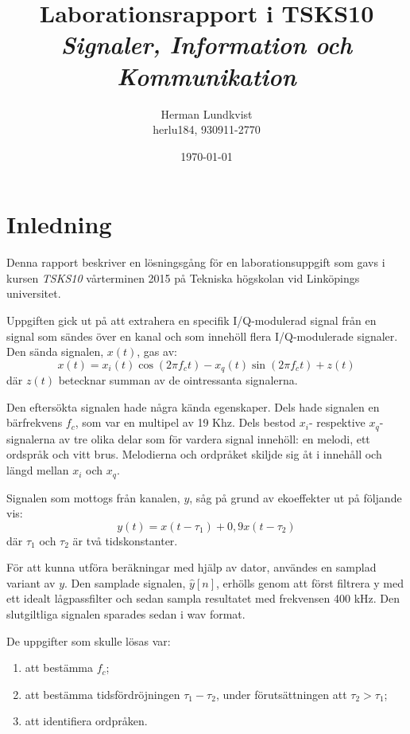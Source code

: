 \documentclass[10pt,twocolumn]{article}
\title{Laborationsrapport i TSKS10 \emph{Signaler, Information och Kommunikation}}
\author{Herman Lundkvist \\ herlu184, 930911-2770 }
\date{\today}
\begin{document}
\newcommand{\yhat}{$\hat{y}[n]$\xspace}

\maketitle

\section{Inledning}

Denna rapport beskriver en lösningsgång för en laborationsuppgift som gavs i
kursen \emph{TSKS10} vårterminen 2015 på Tekniska högskolan vid Linköpings
universitet.

Uppgiften gick ut på att extrahera en specifik I/Q-modulerad signal från en signal som sändes
över en kanal och som innehöll flera I/Q-modulerade signaler. Den sända signalen, $x(t)$, gas av:
\begin{equation}
x(t) = x_i(t) \cos(2 \pi f_ct) - x_q(t) \sin(2 \pi f_c t) + z(t)
\label{e1}
\end{equation}
där $z(t)$ betecknar summan av de ointressanta signalerna.

Den eftersökta signalen hade några kända egenskaper. Dels hade signalen en
bärfrekvens $f_c$, som var en multipel av 19 Khz. Dels bestod $x_i$- respektive
$x_q$-signalerna av tre olika delar som för vardera signal innehöll: en melodi, ett ordspråk
och vitt brus. Melodierna och ordpråket skiljde sig åt i
innehåll och längd mellan $x_i$ och $x_q$.

Signalen som mottogs från kanalen, $y$, såg på grund av ekoeffekter ut på
följande vis:
\begin{equation}
    y(t)=x(t - \tau_1) + 0,9 x(t - \tau_2)
\end{equation}
där $\tau_1$ och $\tau_2$ är två tidskonstanter.

För att kunna utföra beräkningar med hjälp av dator, användes en samplad
variant av $y$. Den samplade signalen, \yhat, erhölls genom att först
filtrera y med ett idealt lågpassfilter och sedan sampla resultatet med
frekvensen 400 kHz. Den slutgiltliga signalen sparades sedan i wav format.

De uppgifter som skulle lösas var:
\begin{enumerate}
\item att bestämma $f_c$;
\item att bestämma tidsfördröjningen $\tau_1-\tau_2$, under förutsättningen att
$\tau_2 > \tau_1$;
\item att identifiera ordpråken.
\end{enumerate}
\end{document}
